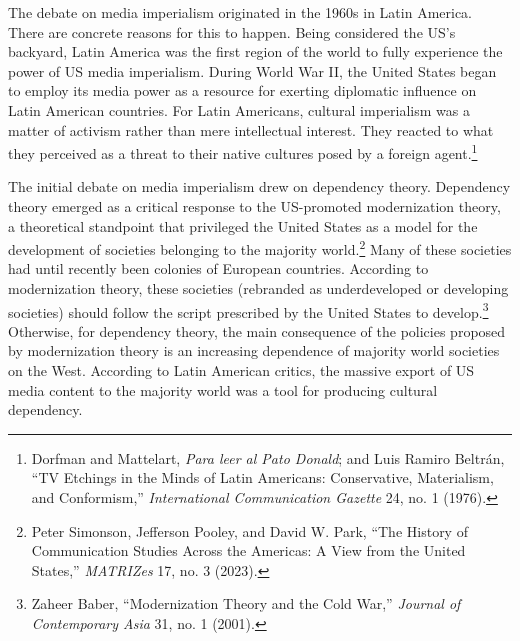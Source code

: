 \documentclass{tufte-handout}
\begin{document}
The debate on media imperialism originated in the 1960s in Latin
America. There are concrete reasons for this to happen. Being considered
the US's backyard, Latin America was the first region of the world to
fully experience the power of US media imperialism. During World War II,
the United States began to employ its media power as a resource for
exerting diplomatic influence on Latin American countries. For Latin
Americans, cultural imperialism was a matter of activism rather than
mere intellectual interest. They reacted to what they perceived as a
threat to their native cultures posed by a foreign agent.\footnote{Dorfman
  and Mattelart, \emph{Para leer al Pato Donald}; and Luis Ramiro
  Beltrán, ``TV Etchings in the Minds of Latin Americans: Conservative,
  Materialism, and Conformism,'' \emph{International Communication
  Gazette} 24, no. 1 (1976).}

The initial debate on media imperialism drew on dependency theory.
Dependency theory emerged as a critical response to the US-promoted
modernization theory, a theoretical standpoint that privileged the
United States as a model for the development of societies belonging to
the majority world.\footnote{Peter Simonson, Jefferson Pooley, and David
  W. Park, ``The History of Communication Studies Across the Americas: A
  View from the United States,'' \emph{MATRIZes} 17, no. 3 (2023).} Many
of these societies had until recently been colonies of European
countries. According to modernization theory, these societies (rebranded
as underdeveloped or developing societies) should follow the script
prescribed by the United States to develop.\footnote{Zaheer Baber,
  ``Modernization Theory and the Cold War,'' \emph{Journal of
  Contemporary Asia} 31, no. 1 (2001).} Otherwise, for dependency
theory, the main consequence of the policies proposed by modernization
theory is an increasing dependence of majority world societies on the
West. According to Latin American critics, the massive export of US
media content to the majority world was a tool for producing cultural
dependency.
\end{document}
